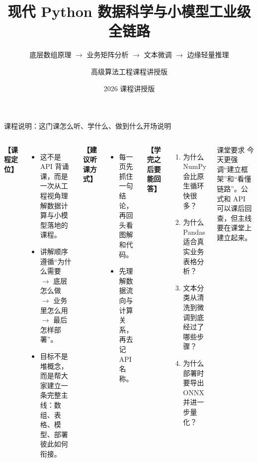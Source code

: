 \documentclass[aspectratio=169,9pt]{beamer}
\title[现代数据科学与小模型全链路]{现代 Python 数据科学与小模型工业级全链路}
\subtitle{底层数组原理 $\to$ 业务矩阵分析 $\to$ 文本微调 $\to$ 边缘轻量推理}
\author{高级算法工程课程讲授版}
\date{2026 课程讲授版}
\begin{document}
\begin{frame}
    \titlepage
\end{frame}

\begin{frame}{课程说明：这门课怎么听、学什么、做到什么}{开场说明}
\begin{columns}[T]
    \textbf{【课程定位】}
    \begin{itemize}
        \item 这不是 API 背诵课，而是一次从工程视角理解数据计算与小模型落地的课程。
        \item 讲解顺序遵循“为什么需要 $\to$ 底层怎么做 $\to$ 业务里怎么用 $\to$ 最后怎样部署”。
        \item 目标不是堆概念，而是帮大家建立一条完整主线：数组、表格、模型、部署彼此如何衔接。
    \end{itemize}

    \textbf{【建议听课方式】}
    \begin{itemize}
        \item 每一页先抓住一句结论，再回头看图解和代码。
        \item 先理解数据流向与计算关系，再去记 API 名称。
    \end{itemize}

    \textbf{【学完之后要能回答】}
    \begin{enumerate}
        \item 为什么 NumPy 会比原生循环快很多？
        \item 为什么 Pandas 适合真实业务表格分析？
        \item 文本分类从清洗到微调到底经过了哪些步骤？
        \item 为什么部署时要导出 ONNX 并进一步量化？
    \end{enumerate}

    \begin{alertblock}{课堂要求}
        \scriptsize 今天更强调“建立框架”和“看懂链路”。公式和 API 可以课后回查，但主线要在课堂上建立起来。
    \end{alertblock}
\end{columns}
\end{frame}
\end{document}
